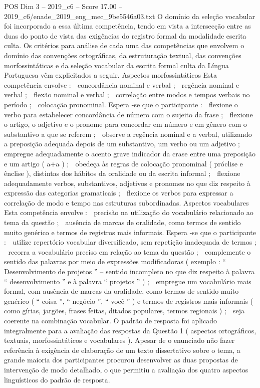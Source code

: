 \begin{textsample}{POS Dim 3 – 2019\_c6 – Score 17.00 – 2019\_c6/enade\_2019\_eng\_mec\_9be5546a03.txt}
O domínio da seleção vocabular foi incorporado a essa última competência, tendo em vista a intersecção entre as duas do ponto de vista das exigências do registro formal da modalidade escrita culta.
Os critérios para análise de cada uma das competências que envolvem o domínio das convenções ortográficas, da estruturação textual, das convenções morfossintáticas e da seleção vocabular da escrita formal culta da Língua Portuguesa vêm explicitados a seguir.
Aspectos morfossintáticos Esta competência envolve :  concordância nominal e verbal ;  regência nominal e verbal ;  flexão nominal e verbal ;  correlação entre modos e tempos verbais no período ;  colocação pronominal.
Espera -se que o participante :  flexione o verbo para estabelecer concordância de número com o sujeito da frase ;  flexione o artigo, o adjetivo e o pronome para concordar em número e em gênero com o substantivo a que se referem ;  observe a regência nominal e a verbal, utilizando a preposição adequada depois de um substantivo, um verbo ou um adjetivo ;  empregue adequadamente o acento grave indicador da crase entre uma preposição e um artigo ( a+a ) ;  obedeça às regras de colocação pronominal ( próclise e ênclise ), distintas dos hábitos da oralidade ou da escrita informal ;  flexione adequadamente verbos, substantivos, adjetivos e pronomes no que diz respeito à expressão das categorias gramaticais ;  flexione os verbos para expressar a correlação de modo e tempo nas estruturas subordinadas.
Aspectos vocabulares Esta competência envolve :  precisão na utilização do vocabulário relacionado ao tema da questão ;  ausência de marcas de oralidade, como termos de sentido muito genérico e termos de registros mais informais.
Espera -se que o participante :  utilize repertório vocabular diversificado, sem repetição inadequada de termos ;  recorra a vocabulário preciso em relação ao tema da questão ;  complemente o sentido das palavras por meio de expressões modificadoras ( exemplo : “ Desenvolvimento de projetos ” – sentido incompleto no que diz respeito à palavra “ desenvolvimento ” e à palavra “ projetos ” ) ;  empregue um vocabulário mais formal, com ausência de marcas da oralidade, como termos de sentido muito genérico ( “ coisa ”, “ negócio ”, “ você ” ) e termos de registros mais informais ( como gírias, jargões, frases feitas, ditados populares, termos regionais ) ;  seja coerente na combinação vocabular.
O padrão de resposta foi aplicado integralmente para a avaliação das respostas da Questão 1 ( aspectos ortográficos, textuais, morfossintáticos e vocabulares ).
Apesar de o enunciado não fazer referência à exigência de elaboração de um texto dissertativo sobre o tema, a grande maioria dos participantes procurou desenvolver as duas propostas de intervenção de modo detalhado, o que permitiu a avaliação dos quatro aspectos linguísticos do padrão de resposta.

\end{textsample}
